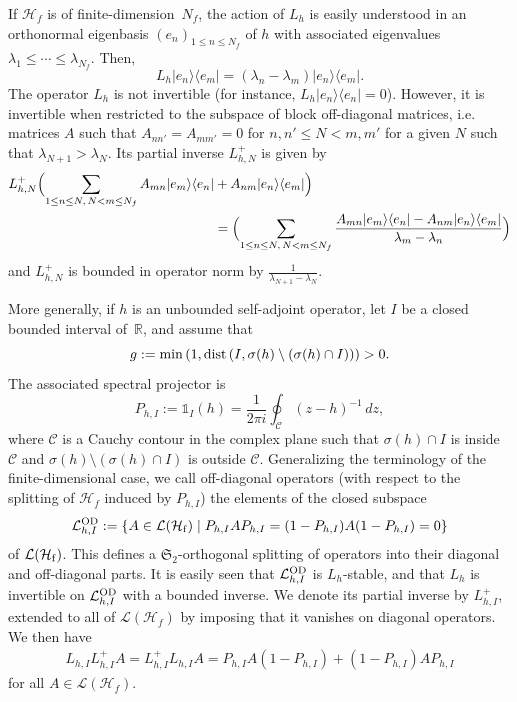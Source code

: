 \documentclass[a4paper,11pt]{article}
\newcommand{\Schatten}{{\mathfrak S}}
\theoremstyle{plain}
\theoremstyle{remark}
\def\R{{\mathbb R}}
\def\cH{{\mathcal H}}
\begin{document}
If $\mathcal H_{f}$ is of  finite-dimension~{$N_{f}$}, the action of $L_{h}$ is
easily understood in an orthonormal eigenbasis $(e_{n})_{1\leq n\leq N_{f}}$ of $h$ with associated
 eigenvalues {$\lambda_{1}\leq\cdots\leq \lambda_{N_f}$}. Then,
\[
L_{h} |e_{n}\rangle\langle e_{m}| = (\lambda_{n} - \lambda_{m})
|e_{n}\rangle\langle e_{m}|.
\]
The operator $L_{h}$ is not invertible (for instance,
$L_{h} |e_{n} \rangle\langle e_{n}| = 0$). However, it is invertible
when restricted to the subspace of block off-diagonal matrices, i.e.
matrices $A$ such that $A_{nn'} = A_{mm'} = 0$ for $n,n' \le N < m,m'$
for a given $N$ such that $\lambda_{N+1} > \lambda_{N}$. Its partial
inverse $L_{h,N}^{+}$ is given by
\begin{align}\nonumber
  L_{h,N}^{+}\Bigl( \sum_{1 \le n \le N,\, N<
    m  \le N_f} A_{mn} |e_{m}\rangle\langle e_{n}| &+ A_{nm}
  |e_{n}\rangle\langle e_{m}| \Bigr) \\
    \label{eq:explicit_inverse_liouvillian}
  &= \Bigl( \sum_{1 \le n \le N, \,N<
    m \le N_f} \frac{A_{mn} |e_{m}\rangle\langle e_{n}| - A_{nm}
  |e_{n}\rangle\langle e_{m}|}{\lambda_{m} - \lambda_{n}} \Bigr)
\end{align}
and $L_{h,N}^{+}$ is bounded in operator norm by $\frac{1}{\lambda_{N+1}-\lambda_{N}}$.

\medskip

More generally, if $h$ is an unbounded self-adjoint operator, let $I$ be a closed bounded interval of~$\R$,
and assume that
$$
g := \min\left( 1,{\rm dist}\left(I,\sigma(h) \setminus (\sigma(h) \cap I) \right) \right) > 0.
$$
The associated spectral projector is
\begin{equation}
  P_{h,I}:={\mathds 1}_I(h)= \frac{1}{2\pi i} \oint_{\mathcal C} (z-h)^{-1} \, dz, \label{eq:int_rep}
\end{equation}
where $\mathcal C$ is a Cauchy contour in the complex plane such that
$\sigma(h) \cap I$ is inside $\mathcal C$ and $\sigma(h) \setminus
(\sigma(h) \cap I)$ is outside ${\mathcal C}$.
Generalizing the terminology of the finite-dimensional case, we call
off-diagonal operators (with respect to the splitting of
$\mathcal H_{f}$ induced by $P_{h,I}$) the elements of the closed
subspace
$$
\mathcal L^{\rm OD}_{h,I}:=\left\{ A \in \mathcal L(\cH_{\rm f}) \; | \; P_{h,I}AP_{h,I}=(1-P_{h,I})A(1-P_{h,I})=0 \right\}
$$
of $\mathcal L(\cH_{\rm f})$. This defines a
$\Schatten_{2}$-orthogonal splitting of operators into their diagonal
and off-diagonal parts. It is easily seen that
$\mathcal L^{\rm OD}_{h,I}$ is $L_h$-stable, and that $L_h$ is
invertible on $\mathcal L^{\rm OD}_{h,I}$ with a bounded inverse. We denote its partial
inverse by $L_{h,I}^{+}$, extended to all of
$\mathcal L(\cH_{f})$ by imposing that it vanishes on diagonal
operators. We then have
\begin{align*}
  L_{h,I} L_{h,I}^{+} A = L_{h,I}^{+} L_{h,I} A = P_{h,I} A (1-P_{h,I}) + (1-P_{h,I}) A P_{h,I}
\end{align*}
for all $A \in \mathcal L(\cH_{f})$.
\end{document}
